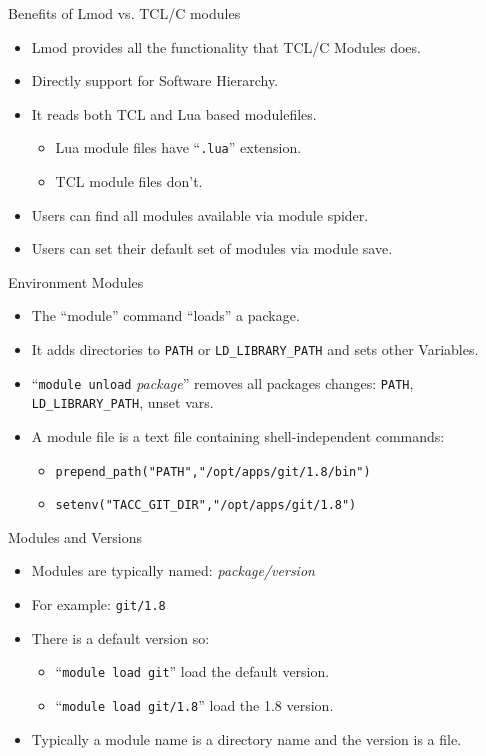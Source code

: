 \documentclass{beamer}
\begin{document}
\begin{frame}{Benefits of Lmod vs. TCL/C modules}

  \begin{itemize}
    \item Lmod provides all the functionality that TCL/C Modules does.
    \item Directly support for Software Hierarchy.
    \item It reads both TCL and Lua based modulefiles.
      \begin{itemize}
        \item Lua module files have ``\texttt{.lua}'' extension.
        \item TCL module files don't.
      \end{itemize}
    \item Users can find all modules available via {\color{blue}module spider}.
    \item Users can set their default set of modules via
      {\color{blue}module  save}.
  \end{itemize}
\end{frame}

\begin{frame}{Environment Modules}
  \begin{itemize}
    \item The ``module'' command ``loads'' a package.
    \item It adds directories to \texttt{PATH} or \texttt{LD\_LIBRARY\_PATH} and
      sets other  Variables. 
    \item ``\texttt{module unload} \emph{package}'' removes all packages
      changes: \texttt{PATH}, \texttt{LD\_LIBRARY\_PATH}, unset vars.
    \item A module file is a text file containing shell-independent commands:
      \begin{itemize}
        \item \texttt{prepend\_path("PATH","/opt/apps/git/1.8/bin")}
        \item \texttt{setenv("TACC\_GIT\_DIR","/opt/apps/git/1.8")}
      \end{itemize}
  \end{itemize}
\end{frame}

\begin{frame}{Modules and Versions}
  \begin{itemize}
    \item Modules are typically named: \emph{package/version}
    \item For example: \texttt{git/1.8}
    \item There is a default version so:
      \begin{itemize}
        \item ``\texttt{module load git}'' load the default version.
        \item ``\texttt{module load git/1.8}'' load the 1.8 version.
      \end{itemize}
    \item Typically a module name is a directory name and the version
      is a file.
  \end{itemize}
\end{frame}
\end{document}
